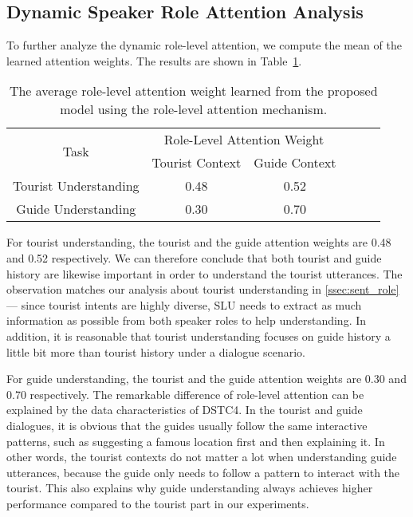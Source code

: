 \documentclass{article}
\begin{document}
\subsection{Dynamic Speaker Role Attention Analysis}
To further analyze the dynamic role-level attention, we compute the mean of the learned attention weights.
The results are shown in Table~\ref{tab:role_att}.

\begin{table}
\centering
\begin{tabular}{ | c | c | c | c | c | c | }
    \hline
    \multirow{2}{*}{Task} & \multicolumn{2}{|c|}{Role-Level Attention Weight}\\
    \cline{2-3}
 & Tourist Context & Guide Context\\
\hline \hline
Tourist Understanding & 0.48 & 0.52\\
Guide Understanding & 0.30 & 0.70\\
    \hline
  \end{tabular}
\caption{The average role-level attention weight learned from the proposed model using the role-level attention mechanism.}
\label{tab:role_att}
\end{table}

For tourist understanding, the tourist and the guide attention weights are 0.48 and 0.52 respectively. %
We can therefore conclude that both tourist and guide history are likewise important in order to understand the tourist utterances.
The observation matches our analysis about tourist understanding in \ref{ssec:sent_role} --- since tourist intents are highly diverse, SLU needs to extract as much information as possible from both speaker roles to help understanding.
In addition, it is reasonable that tourist understanding focuses on guide history a little bit more than tourist history under a dialogue scenario. 

For guide understanding, the tourist and the guide attention weights are 0.30 and 0.70 respectively. %
The remarkable difference of role-level attention can be explained by the data characteristics of DSTC4.
In the tourist and guide dialogues, it is obvious that the guides usually follow the same interactive patterns, such as suggesting a famous location first and then explaining it.
In other words, the tourist contexts do not matter a lot when understanding guide utterances, because the guide only needs to follow a pattern to interact with the tourist.
This also explains why guide understanding always achieves higher performance compared to the tourist part in our experiments.
\end{document}
